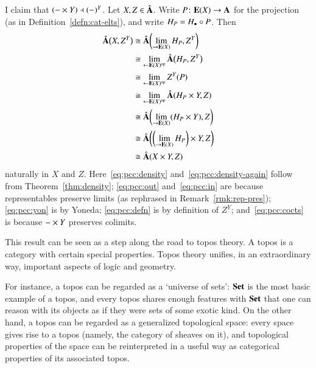 \begin{pf}
I claim that $(- \times Y) \dashv (-)^Y$.  Let $X, Z \in
\hat{\mathbf{A}}$.  Write $P\from \elt{X} \to \scat{A}$ for the projection
(as in Definition~\ref{defn:cat-elts}), and write $H_P = H_\bullet \mathbin{\circ} P$.
Then
%
\begin{align}
\label{eq:pcc:density}
\hat{\mathbf{A}}\bigl(X, Z^Y\bigr) &
\cong
\hat{\mathbf{A}} \biggl( \lim\limits_{\rightarrow \mathbf{E}(X)} H_P, Z^Y \biggr)  \\
\label{eq:pcc:out}
        &
\cong
\lim\limits_{\leftarrow \mathbf{E}(X)^{\mathrm{op}}} \hat{\mathbf{A}}\bigl(H_P, Z^Y\bigr)   \\
\label{eq:pcc:yon}
        &
\cong
\lim\limits_{\leftarrow \mathbf{E}(X)^{\mathrm{op}}} Z^Y(P)                       \\
\label{eq:pcc:defn}
        &
\cong
\lim\limits_{\leftarrow \mathbf{E}(X)^{\mathrm{op}}} \hat{\mathbf{A}}(H_P \times Y, Z)     \\
\label{eq:pcc:in}
        &
\cong
\hat{\mathbf{A}}\biggl( \lim\limits_{\rightarrow \mathbf{E}(X)} (H_P \times Y), Z \biggr) \\
\label{eq:pcc:cocts}
       &
\cong
\hat{\mathbf{A}}\biggl(\biggl(\lim\limits_{\rightarrow \mathbf{E}(X)} H_P\biggr) \times Y, Z\biggr) \\
\label{eq:pcc:density-again}
        &
\cong
\hat{\mathbf{A}}(X \times Y, Z)
\end{align}
%
naturally in $X$ and $Z$.  Here~\eqref{eq:pcc:density}
and~\eqref{eq:pcc:density-again} follow from Theorem~\ref{thm:density};
\eqref{eq:pcc:out} and~\eqref{eq:pcc:in} are because representables
preserve limits (as rephrased in Remark~\ref{rmk:rep-pres});
\eqref{eq:pcc:yon} is by Yoneda; \eqref{eq:pcc:defn} is by definition of
$Z^Y$; and~\eqref{eq:pcc:cocts} is because $-\times Y$ preserves
colimits.
\end{pf}

This result can be seen as a step along the road to topos%
%
%
theory.  A topos is a category with certain special properties.  Topos
theory unifies, in an extraordinary way, important aspects of logic and
geometry.

For instance, a topos can be regarded as a `universe of sets':%
%
%
$\mathbf{Set}$ is the most basic example of a topos, and every topos shares enough
features with $\mathbf{Set}$ that one can reason with its objects as if they were
sets of some exotic kind.  On the other hand, a topos can be regarded as a
generalized topological space:%
%
%
every space gives rise to a topos (namely, the category of sheaves%
%
%
on it), and topological properties of the space can be reinterpreted in a
useful way as categorical properties of its associated topos.

